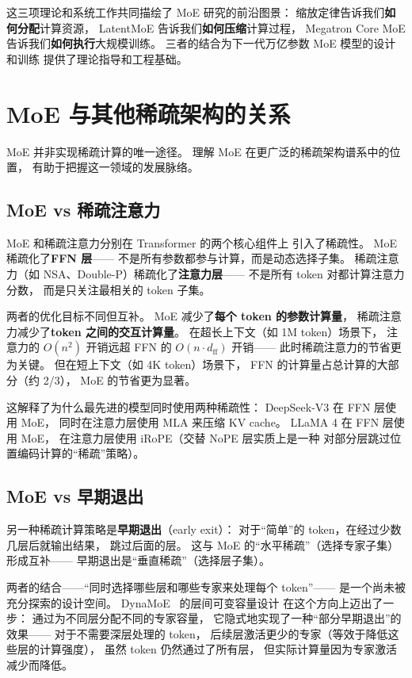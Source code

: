 这三项理论和系统工作共同描绘了 MoE 研究的前沿图景：
缩放定律告诉我们\textbf{如何分配}计算资源，
LatentMoE 告诉我们\textbf{如何压缩}计算过程，
Megatron Core MoE 告诉我们\textbf{如何执行}大规模训练。
三者的结合为下一代万亿参数 MoE 模型的设计和训练
提供了理论指导和工程基础。

\section{MoE 与其他稀疏架构的关系}
\label{sec:moe-related-architectures}

MoE 并非实现稀疏计算的唯一途径。
理解 MoE 在更广泛的稀疏架构谱系中的位置，
有助于把握这一领域的发展脉络。

\subsection{MoE vs 稀疏注意力}

MoE 和稀疏注意力分别在 Transformer 的两个核心组件上
引入了稀疏性。
MoE 稀疏化了\textbf{FFN 层}——
不是所有参数都参与计算，而是动态选择子集。
稀疏注意力（如 NSA、Double-P）稀疏化了\textbf{注意力层}——
不是所有 token 对都计算注意力分数，
而是只关注最相关的 token 子集。

两者的优化目标不同但互补。
MoE 减少了\textbf{每个 token 的参数计算量}，
稀疏注意力减少了\textbf{token 之间的交互计算量}。
在超长上下文（如 1M token）场景下，
注意力的 $O(n^2)$ 开销远超 FFN 的 $O(n \cdot d_{\text{ff}})$ 开销——
此时稀疏注意力的节省更为关键。
但在短上下文（如 4K token）场景下，
FFN 的计算量占总计算的大部分（约 2/3），
MoE 的节省更为显著。

这解释了为什么最先进的模型同时使用两种稀疏性：
DeepSeek-V3 在 FFN 层使用 MoE，
同时在注意力层使用 MLA 来压缩 KV cache。
LLaMA 4 在 FFN 层使用 MoE，
在注意力层使用 iRoPE（交替 NoPE 层实质上是一种
对部分层跳过位置编码计算的“稀疏”策略）。

\subsection{MoE vs 早期退出}

另一种稀疏计算策略是\textbf{早期退出}（early exit）：
对于“简单”的 token，在经过少数几层后就输出结果，
跳过后面的层。
这与 MoE 的“水平稀疏”（选择专家子集）形成互补——
早期退出是“垂直稀疏”（选择层子集）。

两者的结合——“同时选择哪些层和哪些专家来处理每个 token”——
是一个尚未被充分探索的设计空间。
DynaMoE~\cite{gulme2026dynamoe} 的层间可变容量设计
在这个方向上迈出了一步：
通过为不同层分配不同的专家容量，
它隐式地实现了一种“部分早期退出”的效果——
对于不需要深层处理的 token，
后续层激活更少的专家（等效于降低这些层的计算强度），
虽然 token 仍然通过了所有层，
但实际计算量因为专家激活减少而降低。

